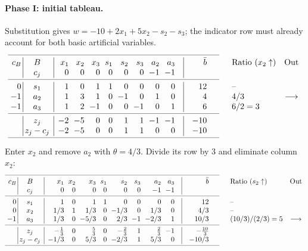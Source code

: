 \documentclass[11pt,a4paper]{article}
\begin{document}
\paragraph{Phase I: initial tableau.}
Substitution gives $w=-10+2x_1+5x_2-s_2-s_3$; the indicator row must
already account for both basic artificial variables.
\[
  \setlength{\arraycolsep}{3pt}
  \begin{array}{r@{\hspace{0.2em}}|@{\hspace{0.2em}}c@{\enspace}|@{\enspace}rrrrrrrr@{\quad}|@{\quad}r@{\qquad\quad}l@{\quad}c}\cmidrule(r{1.5em}){1-11}
    c_B & B & x_1 & x_2 & x_3 & s_1 & s_2 & s_3 & a_2 & a_3 & \bar b & \text{Ratio }(x_2\uparrow) & \text{Out}\\
    & c_j & 0 & 0 & 0 & 0 & 0 & 0 & -1 & -1 & & & \\
    \cmidrule(r{1.5em}){1-11}
    0 & s_1 & 1 & 0 & 1 & 1 & 0 & 0 & 0 & 0 & 12 & \text{--} & \\
    -1 & a_2 & 1 & 3 & 1 & 0 & -1 & 0 & 1 & 0 & 4 & 4 / 3 & \longrightarrow\\
    -1 & a_3 & 1 & 2 & -1 & 0 & 0 & -1 & 0 & 1 & 6 & 6 / 2=3 & \\
    \cmidrule(r{1.5em}){1-11}
    & z_j & -2 & -5 & 0 & 0 & 1 & 1 & -1 & -1 & -10 & & \\
    & z_j-c_j & -2 & -5 & 0 & 0 & 1 & 1 & 0 & 0 & -10 & & \\
    \cmidrule(r{1.5em}){1-11}
  \end{array}
\]
Enter $x_2$ and remove $a_2$ with $\theta=4/3$. Divide its row by $3$ and eliminate column $x_2$:
\[
  \setlength{\arraycolsep}{3pt}
  \begin{array}{r@{\hspace{0.2em}}|@{\hspace{0.2em}}c@{\enspace}|@{\enspace}rrrrrrrr@{\quad}|@{\quad}r@{\qquad\quad}l@{\quad}c}\cmidrule(r{1.5em}){1-11}
    c_B & B & x_1 & x_2 & x_3 & s_1 & s_2 & s_3 & a_2 & a_3 & \bar b & \text{Ratio }(s_2\uparrow) & \text{Out}\\
    & c_j & 0 & 0 & 0 & 0 & 0 & 0 & -1 & -1 & & & \\
    \cmidrule(r{1.5em}){1-11}
    0 & s_1 & 1 & 0 & 1 & 1 & 0 & 0 & 0 & 0 & 12 & \text{--} & \\
    0 & x_2 & 1/3 & 1 & 1/3 & 0 & -1/3 & 0 & 1/3 & 0 & 4/3 & \text{--} & \\
    -1 & a_3 & 1/3 & 0 & -5/3 & 0 & 2/3 & -1 & -2/3 & 1 & 10/3 & (10 / 3) / (2 / 3)=5 & \longrightarrow\\
    \cmidrule(r{1.5em}){1-11}
    & z_j & -\tfrac{1}{3} & 0 & \tfrac{5}{3} & 0 & -\tfrac{2}{3} & 1 & \tfrac{2}{3} & -1 & -\tfrac{10}{3} & & \\
    & z_j-c_j & -1/3 & 0 & 5/3 & 0 & -2/3 & 1 & 5/3 & 0 & -10/3 & & \\
    \cmidrule(r{1.5em}){1-11}
  \end{array}
\]
\end{document}
